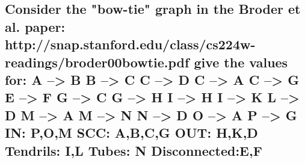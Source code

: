 \documentclass[11pt]{scrartcl} %
\begin{document}
\subsection*{Consider the "bow-tie" graph in the Broder et al. paper:
    http://snap.stanford.edu/class/cs224w-readings/broder00bowtie.pdf
 give the values for:\newline\newline
 	A --> B\newline
    B --> C\newline
    C --> D\newline
    C --> A\newline
    C --> G\newline
    E --> F\newline
    G --> C\newline
    G --> H\newline
    I --> H\newline
    I --> K\newline
    L --> D\newline
    M --> A\newline
    M --> N\newline
    N --> D\newline
    O --> A\newline
    P --> G \newline\newline
	IN: P,O,M\newline
    SCC: A,B,C,G\newline
    OUT: H,K,D\newline
    Tendrils: I,L\newline
    Tubes: N\newline
    Disconnected:E,F}
\end{document}
